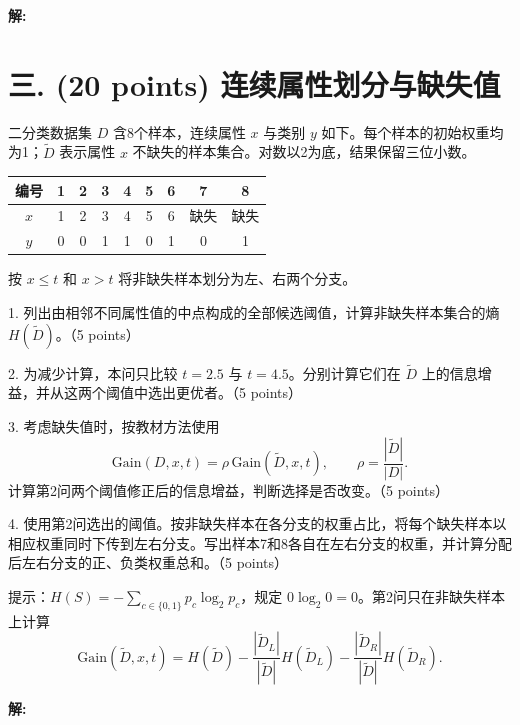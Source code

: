 \documentclass[8pt]{article}
\begin{document}
\textbf{\large 解:}

\newpage
\section*{三. (20 points) 连续属性划分与缺失值}
二分类数据集 $D$ 含8个样本，连续属性 $x$ 与类别 $y$ 如下。每个样本的初始权重均为1；$\tilde D$ 表示属性 $x$ 不缺失的样本集合。对数以2为底，结果保留三位小数。
\begin{center}
\begin{tabular}{c*{8}{c}}
\toprule
编号 & 1 & 2 & 3 & 4 & 5 & 6 & 7 & 8 \\
\midrule
$x$ & 1 & 2 & 3 & 4 & 5 & 6 & 缺失 & 缺失 \\
$y$ & 0 & 0 & 1 & 1 & 0 & 1 & 0 & 1 \\
\bottomrule
\end{tabular}
\end{center}
按 $x\leq t$ 和 $x>t$ 将非缺失样本划分为左、右两个分支。

1. 列出由相邻不同属性值的中点构成的全部候选阈值，计算非缺失样本集合的熵 $H(\tilde D)$。（5 points）

2. 为减少计算，本问只比较 $t=2.5$ 与 $t=4.5$。分别计算它们在 $\tilde D$ 上的信息增益，并从这两个阈值中选出更优者。（5 points）

3. 考虑缺失值时，按教材方法使用
\[
\mathrm{Gain}(D,x,t)=\rho\,\mathrm{Gain}(\tilde D,x,t),
\qquad \rho=\frac{|\tilde D|}{|D|}.
\]
计算第2问两个阈值修正后的信息增益，判断选择是否改变。（5 points）

4. 使用第2问选出的阈值。按非缺失样本在各分支的权重占比，将每个缺失样本以相应权重同时下传到左右分支。写出样本7和8各自在左右分支的权重，并计算分配后左右分支的正、负类权重总和。（5 points）

\noindent 提示：$H(S)=-\sum_{c\in\{0,1\}}p_c\log_2p_c$，规定 $0\log_2 0=0$。第2问只在非缺失样本上计算
\[
\mathrm{Gain}(\tilde D,x,t)=H(\tilde D)
-\frac{|\tilde D_L|}{|\tilde D|}H(\tilde D_L)
-\frac{|\tilde D_R|}{|\tilde D|}H(\tilde D_R).
\]

\textbf{\large 解:}

\newpage
\end{document}
